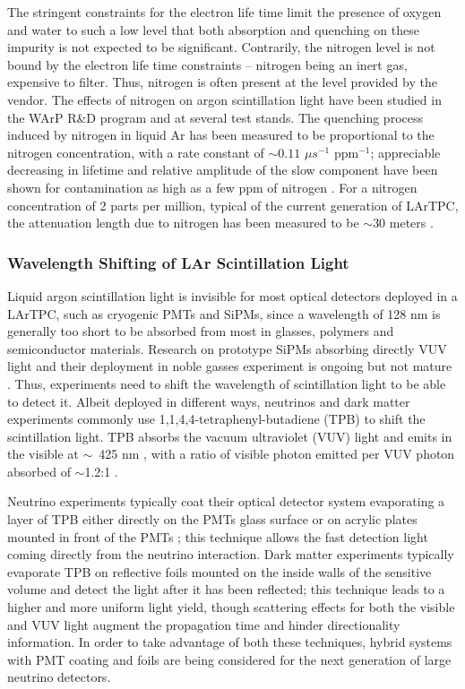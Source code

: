 The stringent constraints for the electron life time limit the presence of oxygen and water to such a low level that both absorption and quenching on these impurity is not expected to be significant.   Contrarily, the nitrogen level is not bound by the electron life time constraints -- nitrogen being an inert gas, expensive to filter. Thus, nitrogen is often present at the level provided by the vendor. The effects of nitrogen on argon scintillation light have been studied in the WArP R\&D program and at several test stands.
The quenching process induced by nitrogen in liquid Ar has been measured to be proportional to the nitrogen concentration, with a rate constant of $\sim  0.11$ $\mu s^{-1}$ ppm$^{-1}$; appreciable decreasing in lifetime and relative amplitude of the slow component have been shown for contamination as high as a few ppm of nitrogen \cite{1748-0221-5-06-P06003}.
For a nitrogen  concentration of 2 parts per million,  typical of the current generation of LArTPC, the attenuation length due to nitrogen has been measured to be $\sim$30 meters \cite{1748-0221-8-07-P07011}. 



\subsubsection{Wavelength Shifting of LAr Scintillation Light}
Liquid argon scintillation light is invisible for most optical detectors deployed in a LArTPC, such as cryogenic PMTs and SiPMs, since a wavelength of 128 nm is  generally too short to be absorbed from most in glasses, polymers and semiconductor materials. Research on prototype SiPMs absorbing directly VUV light and their deployment in noble gasses experiment is ongoing but not mature \cite{1748-0221-8-01-C01003}. Thus, experiments need to shift the wavelength of scintillation light to be able to detect it.  Albeit deployed in different ways, neutrinos and dark matter experiments commonly use  1,1,4,4-tetraphenyl-butadiene (TPB) to shift the scintillation light. 
TPB  absorbs the vacuum ultraviolet (VUV) light and emits in the visible at $\sim$~425 nm \cite{Burton1973}, with a ratio of visible photon emitted per VUV photon absorbed of $\sim$1.2:1 \cite{GEHMAN2011116}.

Neutrino experiments typically coat their optical detector system evaporating a layer of TPB either directly on the PMTs glass surface or on acrylic plates mounted in front of the PMTs \cite{Acciarri2017}; this technique allows the fast detection light coming directly from the neutrino interaction. Dark matter experiments typically evaporate TPB on reflective foils mounted on the inside walls of the sensitive volume and detect the light after it has been reflected; this technique leads to a higher and more uniform light yield, though scattering effects for both the visible and VUV light augment the propagation time and hinder directionality information\cite{Aalseth2018}. In order to take advantage of both these techniques, hybrid systems with PMT coating and foils are being considered for the next generation of large neutrino detectors. 

